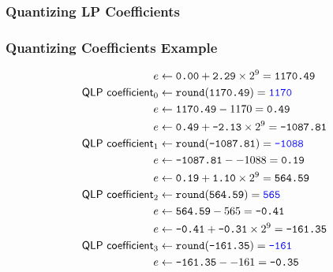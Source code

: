 
\subsubsection{Quantizing LP Coefficients}
\label{alac:quantize_lp_coeffs}


\subsubsection{Quantizing Coefficients Example}
\begin{align*}
e &\leftarrow \texttt{0.00} + \texttt{2.29} \times 2 ^ 9 = \texttt{1170.49} \\
\textsf{QLP coefficient}_0 &\leftarrow \texttt{round}(\texttt{1170.49}) = \texttt{\color{blue}1170} \\
e &\leftarrow \texttt{1170.49} - 1170 = \texttt{0.49} \\
e &\leftarrow \texttt{0.49} + \texttt{-2.13} \times 2 ^ 9 = \texttt{-1087.81} \\
\textsf{QLP coefficient}_1 &\leftarrow \texttt{round}(\texttt{-1087.81}) = \texttt{\color{blue}-1088} \\
e &\leftarrow \texttt{-1087.81} - -1088 = \texttt{0.19} \\
e &\leftarrow \texttt{0.19} + \texttt{1.10} \times 2 ^ 9 = \texttt{564.59} \\
\textsf{QLP coefficient}_2 &\leftarrow\texttt{round}(\texttt{564.59}) = \texttt{\color{blue}565} \\
e &\leftarrow \texttt{564.59} - 565 = \texttt{-0.41} \\
e &\leftarrow \texttt{-0.41} + \texttt{-0.31} \times 2 ^ 9 = \texttt{-161.35} \\
\textsf{QLP coefficient}_3 &\leftarrow \texttt{round}(\texttt{-161.35}) = \texttt{\color{blue}-161} \\
e &\leftarrow \texttt{-161.35} - -161 = \texttt{-0.35} \\
\end{align*}
